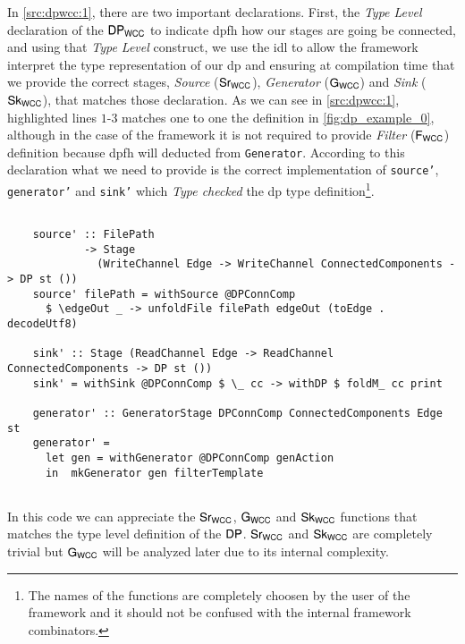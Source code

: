 In \autoref{src:dpwcc:1}, there are two important declarations. First, the \textit{Type Level} declaration of the $\mathsf{DP_{WCC}}$ to indicate \acrshort{dpfh} how our stages are going be connected, and
using that \textit{Type Level} construct, we use the \acrshort{idl} to allow the framework interpret the type representation of our \acrshort{dp} and ensuring at compilation time that we provide the correct stages,  \textit{Source} ($\mathsf{Sr_{WCC}}$), \textit{Generator} ($\mathsf{G_{WCC}}$) and \textit{Sink} ($\mathsf{Sk_{WCC}}$), that matches those declaration. As we can see in \autoref{src:dpwcc:1}, highlighted lines $1$-$3$ matches one to one the definition in \autoref{fig:dp_example_0}, although in the case of the framework it is not required to provide \textit{Filter} ($\mathsf{F_{WCC}}$) definition because \acrshort{dpfh} will deducted from \texttt{Generator}.
According to this declaration what we need to provide is the correct implementation of \texttt{source'}, \texttt{generator'} and \texttt{sink'}
which \textit{Type checked} the \acrshort{dp} type definition\footnote{The names of the functions are completely choosen by the user of the framework and it should not be confused with the internal framework combinators.}.

\begin{listing}[H]
  \begin{verbatim}
    
    source' :: FilePath
            -> Stage
              (WriteChannel Edge -> WriteChannel ConnectedComponents -> DP st ())
    source' filePath = withSource @DPConnComp
      $ \edgeOut _ -> unfoldFile filePath edgeOut (toEdge . decodeUtf8)

    sink' :: Stage (ReadChannel Edge -> ReadChannel ConnectedComponents -> DP st ())
    sink' = withSink @DPConnComp $ \_ cc -> withDP $ foldM_ cc print

    generator' :: GeneratorStage DPConnComp ConnectedComponents Edge st
    generator' =
      let gen = withGenerator @DPConnComp genAction
      in  mkGenerator gen filterTemplate
        
  \end{verbatim}
  \caption[{[\texttt{ConnectedComp.hs}] $\iwc$, $\gwc$ $\owc$ Code}]{In this code we can appreciate the $\iwc$, $\gwc$ and $\owc$ functions that matches the type level definition of the $\DP$. $\iwc$ and $\owc$ are completely trivial but $\gwc$ will be analyzed later due to its internal complexity.}
  \label{src:dpwcc:2}
\end{listing}

